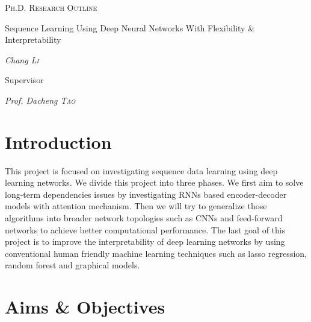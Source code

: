 \documentclass{article} \usepackage{tabularx}
\begin{document}
\begin{titlepage}
	\centering
	\begin{figure}[H]
    \centering
	\end{figure}
	\vspace{2cm} {\scshape\LARGE Ph.D. Research Outline\par}
  \vspace{2cm}
  
	{\scshape\LARGE

    Sequence Learning Using Deep Neural Networks With Flexibility
    \& Interpretability
    
    \par} {\huge\bfseries \par}
	
	\vspace{2cm} {\Large\itshape Chang \textsc{Li}\par} \vfill

  {\Large Supervisor\par} {\Large\itshape Prof. Dacheng
    \textsc{Tao}\par} \vfill

\end{titlepage}

\section{Introduction}
\label{sec:synop}

This project is focused on investigating sequence data learning
using deep learning networks. We divide this project into three
phases. We first aim to solve long-term dependencies issues by
investigating RNNs based encoder-decoder models with attention
mechanism. Then we will try to generalize those algorithms into
broader network topologies such as CNNs and feed-forward networks
to achieve better computational performance. The last goal of
this project is to improve the interpretability of deep learning
networks by using conventional human friendly machine learning
techniques such as lasso regression, random forest and graphical
models.


\section{Aims \& Objectives}
\end{document}
